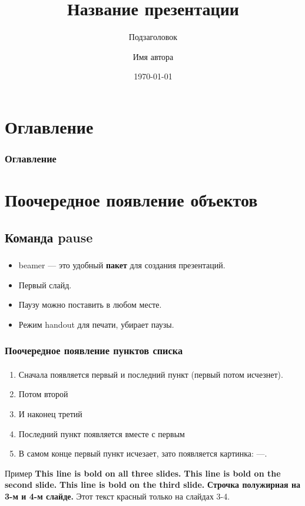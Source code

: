 \documentclass[russian]{beamer}
\author[Автор]{Имя автора}
\title[Презентация]{Название презентации}
\subtitle{Подзаголовок}
\date[Дата]{\today}
\institute[КемГУ]{Кемеровский государственный университет}
\begin{document}
	
\begin{frame}
	\maketitle
\end{frame}

\section{Оглавление}
\begin{frame}
	\frametitle{Оглавление}
	\tableofcontents %
\end{frame}

\section{Поочередное появление объектов}
\subsection{Команда pause}

\begin{frame}
	\frametitle{\insertsection}
	\framesubtitle{\insertsubsection}
	\begin{itemize}
		\item beamer --- это \alert{удобный} \textbf{пакет} для
		создания презентаций.
		\item Первый слайд. \pause
		\item Паузу можно поставить в любом \pause месте.
		\item Режим handout для печати, убирает паузы.
	\end{itemize}
\end{frame}

\begin{frame}
	\frametitle{Поочередное появление пунктов списка}
	\framesubtitle{\insertsubsection}
	\begin{enumerate}
		\item<1-5> Сначала появляется первый и последний пункт
		(первый потом исчезнет).
		\item<2-> Потом второй
		\item<3-> И наконец третий
		\item<1-> Последний пункт появляется вместе с первым
		\item<6-> В самом конце первый пункт исчезает, зато появляется
		картинка: ---.
	\end{enumerate}
\end{frame}

\begin{frame}{Пример}
	\textbf{This line is bold on all three slides.}
	\textbf<2>{This line is bold on the second slide.}
	\textbf<3>{This line is bold on the third slide.}
	\textbf<3-4>{Строчка полужирная на 3-м и 4-м слайде.}
	 Этот текст красный только на слайдах 3-4.
\end{frame}
\end{document}
